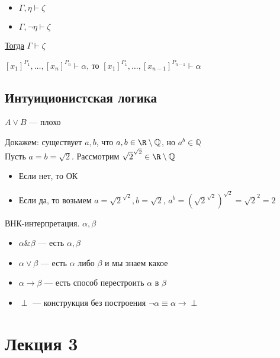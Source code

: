 \documentclass[oneside]{book}
\renewcommand{\leftmark}{}
\begin{document}
\begin{lemma}
	\-
	\begin{itemize}
		\item \(\Gamma, \eta \vdash \zeta\)
		\item \(\Gamma, \neg \eta \vdash \zeta\)
	\end{itemize}
	\uline{Тогда} \(\Gamma \vdash \zeta\)
	\label{org8b29b9e}
\end{lemma}
\begin{lemma}
	\([x_1]^{P_1},\dots,[x_n]^{P_n} \vdash \alpha\), то \([x_1]^{P_1},\dots,[x_{n - 1}]^{P_{n- 1}} \vdash \alpha\)
	\label{org48c93d2}
\end{lemma}
\section{Интуиционистская логика}
\label{sec:org7b84b2e}
\(A \vee B\) --- плохо
\begin{examp}
	Докажем: существует \(a, b\), что \(a, b \in \R \setminus \mathbb{Q}\), но \(a^b \in \mathbb{Q}\) \\
	Пусть \(a = b = \sqrt{2}\). Рассмотрим \(\sqrt{2}^{\sqrt{2}} \in \R \setminus \mathbb{Q}\)
	\begin{itemize}
		\item Если нет, то ОК
		\item Если да, то возьмем \(a = \sqrt{2}^{\sqrt{2}}, b = \sqrt{2}\), \(a^b = (\sqrt{2}^{\sqrt{2}})^{\sqrt{2}} = \sqrt{2}^{2} = 2\)
	\end{itemize}
\end{examp}
\begin{defintion}
	ВНК-интерпретация. \(\alpha, \beta\)
	\begin{itemize}
		\item \(\alpha \& \beta\) --- есть \(\alpha, \beta\)
		\item \(\alpha \vee \beta\) --- есть \(\alpha\) либо \(\beta\) и мы знаем какое
		\item \(\alpha \to \beta\) --- есть способ перестроить \(\alpha\) в \(\beta\)
		\item \(\perp\) --- конструкция без построения \(\neg \alpha \equiv \alpha \to \perp\)
	\end{itemize}
\end{defintion}
\chapter*{Лекция 3}\renewcommand{\leftmark}{Лекция 3}
\label{sec:org386d20c}
\end{document}
